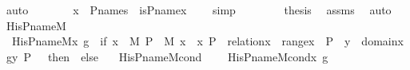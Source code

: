\begin{isabellebody}
\ auto\isanewline
\isanewline
\ \ \ \ \isamarkupfalse%
\ \isamarkupfalse%
\ {\isachardoublequoteopen}x\ {\isasymin}\ P{\isacharunderscore}{\kern0pt}names\ {\isasymlongleftrightarrow}\ is{\isacharunderscore}{\kern0pt}P{\isacharunderscore}{\kern0pt}name{\isacharparenleft}{\kern0pt}x{\isacharparenright}{\kern0pt}\ {\isacharequal}{\kern0pt}\ {}{\isachardoublequoteclose}\ \isamarkupfalse%
\ simp\isanewline
\ \ \isamarkupfalse%
\isanewline
\ \ \isamarkupfalse%
\ \isamarkupfalse%
\ {\isacharquery}{\kern0pt}thesis\ \isamarkupfalse%
\ assms\ \isamarkupfalse%
\ auto\ \isanewline
{}\isamarkupfalse%
%
\endisatagproof
{\isafoldproof}%
%
\isadelimproof
\isanewline
%
\endisadelimproof
\isanewline
{}\isamarkupfalse%
\ His{\isacharunderscore}{\kern0pt}P{\isacharunderscore}{\kern0pt}name{\isacharunderscore}{\kern0pt}M\ \ \isanewline
\ \ {\isachardoublequoteopen}His{\isacharunderscore}{\kern0pt}P{\isacharunderscore}{\kern0pt}name{\isacharunderscore}{\kern0pt}M{\isacharparenleft}{\kern0pt}x{\isacharprime}{\kern0pt}{\isacharcomma}{\kern0pt}\ g{\isacharparenright}{\kern0pt}\ {\isasymequiv}\ {\isacharparenleft}{\kern0pt}if\ {\isasymexists}x\ {\isasymin}\ M{\isachardot}{\kern0pt}\ {\isasymexists}P\ {\isasymin}\ M{\isachardot}{\kern0pt}\ x{\isacharprime}{\kern0pt}\ {\isacharequal}{\kern0pt}\ {\isacharless}{\kern0pt}x{\isacharcomma}{\kern0pt}\ P{\isachargreater}{\kern0pt}\ {\isasymand}\ relation{\isacharparenleft}{\kern0pt}x{\isacharparenright}{\kern0pt}\ {\isasymand}\ range{\isacharparenleft}{\kern0pt}x{\isacharparenright}{\kern0pt}\ {\isasymsubseteq}\ P\ {\isasymand}\ {\isacharparenleft}{\kern0pt}{\isasymforall}y\ {\isasymin}\ domain{\isacharparenleft}{\kern0pt}x{\isacharparenright}{\kern0pt}{\isachardot}{\kern0pt}\ g{\isacharbackquote}{\kern0pt}{\isacharless}{\kern0pt}y{\isacharcomma}{\kern0pt}\ P{\isachargreater}{\kern0pt}\ {\isacharequal}{\kern0pt}\ {}{\isacharparenright}{\kern0pt}\ then\ {}\ else\ {}{\isacharparenright}{\kern0pt}{\isachardoublequoteclose}\ \isanewline
\isanewline
{}\isamarkupfalse%
\ His{\isacharunderscore}{\kern0pt}P{\isacharunderscore}{\kern0pt}name{\isacharunderscore}{\kern0pt}M{\isacharunderscore}{\kern0pt}cond\ \ \isanewline
\ \ {\isachardoublequoteopen}His{\isacharunderscore}{\kern0pt}P{\isacharunderscore}{\kern0pt}name{\isacharunderscore}{\kern0pt}M{\isacharunderscore}{\kern0pt}cond{\isacharparenleft}{\kern0pt}x{\isacharprime}{\kern0pt}{\isacharcomma}{\kern0pt}\ g{\isacharparenright}{\kern0pt}\ {\isasymequiv}\ \isanewline

\end{isabellebody}
